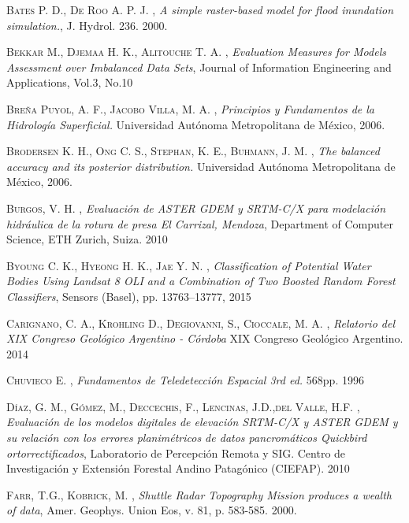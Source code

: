 \begin{thebibliography}{9}

 \textsc{Bates P. D., De Roo A. P. J. } , \textit{A simple raster-based model for flood inundation simulation.},   J. Hydrol. 236. 2000.

 \textsc{Bekkar M., Djemaa H. K., Alitouche T. A.} , \textit{Evaluation Measures for Models Assessment over Imbalanced Data Sets}, Journal of Information Engineering and Applications, Vol.3, No.10

 \textsc{Breña Puyol, A. F., Jacobo Villa, M. A.} , \textit{Principios y Fundamentos de la Hidrología Superficial.} Universidad Autónoma Metropolitana de México, 2006.


 \textsc{Brodersen K. H., Ong C. S., Stephan, K. E., Buhmann, J. M.} , \textit{The balanced accuracy and its posterior distribution.} Universidad Autónoma Metropolitana de México, 2006.

 \textsc{Burgos, V. H.} , \textit{Evaluación de ASTER GDEM y SRTM-C/X para modelación hidráulica de la rotura de presa El Carrizal, Mendoza}, Department of Computer Science, ETH Zurich, Suiza. 2010

 \textsc{Byoung C. K., Hyeong H. K., Jae Y. N.} , \textit{Classification of Potential Water Bodies Using Landsat 8 OLI and a Combination of Two Boosted Random Forest Classifiers}, Sensors (Basel), pp. 13763–13777, 2015

 \textsc{Carignano, C. A., Krohling D., Degiovanni, S., Cioccale, M. A.} , \textit{Relatorio del XIX Congreso Geológico Argentino - Córdoba} XIX Congreso Geológico Argentino. 2014

 \textsc{Chuvieco E.} , \textit{Fundamentos de Teledetección Espacial 3rd ed.} 568pp. 1996

 \textsc{Díaz, G. M., Gómez, M., Deccechis, F., Lencinas, J.D.,del Valle, H.F.} , \textit{Evaluación de los modelos digitales de elevación SRTM-C/X y ASTER GDEM y su relación con los errores planimétricos de datos pancromáticos Quickbird ortorrectificados}, Laboratorio de Percepción Remota y SIG. Centro de Investigación y Extensión Forestal Andino Patagónico (CIEFAP). 2010

 \textsc{Farr, T.G., Kobrick, M.} , \textit{Shuttle Radar Topography Mission produces a wealth of data}, Amer. Geophys. Union Eos, v. 81, p. 583-585. 2000.


\end{thebibliography}
